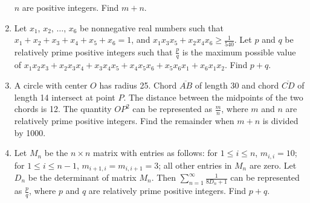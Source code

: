 \documentclass{article}
\begin{document}
\begin{enumerate}[label=\arabic*., itemsep=0.5em]
\(n\) are positive integers. Find \(m+n\).\par \vspace{0.5em}\item Let \(x_1\), \(x_2\), \(\dots\), \(x_6\) be nonnegative real numbers such that \(x_1 + x_2 + x_3 + x_4 + x_5 + x_6 = 1\), and \(x_1x_3x_5 + x_2x_4x_6 \ge {\frac{1}{540}}\). Let \(p\) and \(q\) be relatively prime positive integers such that \(\frac{p}{q}\) is the maximum possible value of \(x_1x_2x_3 + x_2x_3x_4 + x_3x_4x_5 + x_4x_5x_6 + x_5x_6x_1 + x_6x_1x_2\). Find \(p + q\).\par \vspace{0.5em}\item A circle with center \(O\) has radius 25. Chord \(\overline{AB}\) of length 30 and chord \(\overline{CD}\) of length 14 intersect at point \(P\). The distance between the midpoints of the two chords is 12. The quantity \(OP^2\) can be represented as \(\frac{m}{n}\), where \(m\) and \(n\) are relatively prime positive integers. Find the remainder when \(m + n\) is divided by 1000.\par \vspace{0.5em}\item Let \(M_n\) be the \(n \times n\) matrix with entries as follows: for \(1 \le i \le n\), \(m_{i,i} = 10\); for \(1 \le i \le n - 1\), \(m_{i+1,i} = m_{i,i+1} = 3\); all other entries in \(M_n\) are zero. Let \(D_n\) be the determinant of matrix \(M_n\). Then \(\sum_{n=1}^{\infty} \frac{1}{8D_n+1}\) can be represented as \(\frac{p}{q}\), where \(p\) and \(q\) are relatively prime positive integers. Find \(p + q\). 


\end{enumerate}
\end{document}
